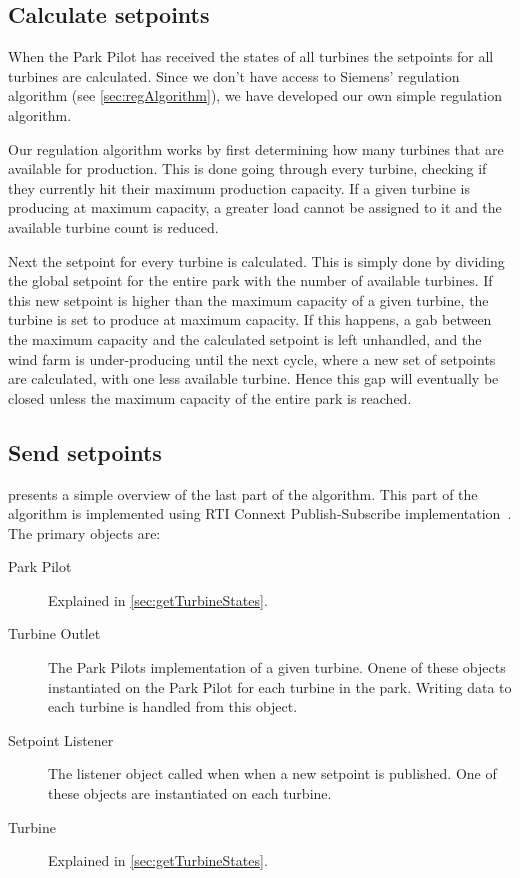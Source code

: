 \subsection{Calculate setpoints}\label{sec:calculateSetpoints}

When the Park Pilot has received the states of all turbines the setpoints for all turbines are calculated. Since we don't have access to Siemens' regulation algorithm (see \cref{sec:regAlgorithm}), we have developed our own simple regulation algorithm.

Our regulation algorithm works by first determining how many turbines that are available for production. This is done going through every turbine, checking if they currently hit their maximum production capacity. If a given turbine is producing at maximum capacity, a greater load cannot be assigned to it and the available turbine count is reduced. 

Next the setpoint for every turbine is calculated. This is simply done by dividing the global setpoint for the entire park with the number of available turbines. If this new setpoint is higher than the maximum capacity of a given turbine, the turbine is set to produce at maximum capacity. If this happens, a gab between the maximum capacity and the calculated setpoint is left unhandled, and the wind farm is under-producing until the next cycle, where a new set of setpoints are calculated, with one less available turbine. Hence this gap will eventually be closed unless the maximum capacity of the entire park is reached.

\subsection{Send setpoints}

 presents a simple overview of the last part of the algorithm. This part of the algorithm is implemented using RTI Connext Publish-Subscribe implementation~\cite{rtiConnextUsersManual}. The primary objects are:

\begin{description}
	\item [Park Pilot] Explained in \cref{sec:getTurbineStates}.
	\item [Turbine Outlet] The Park Pilots implementation of a given turbine. Onene of these objects instantiated on the Park Pilot for each turbine in the park. Writing data to each turbine is handled from this object.
	\item [Setpoint Listener] The listener object called when when a new setpoint is published. One of these objects are instantiated on each turbine.
	\item [Turbine] Explained in \cref{sec:getTurbineStates}.
\end{description}

